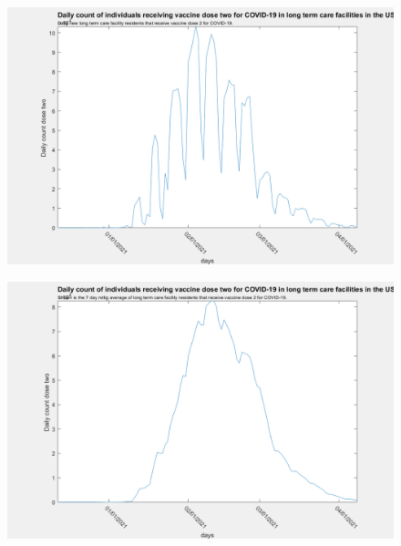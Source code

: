 \documentclass[twoside]{article}
\begin{document}
\begin{multicols}{2}
\begin{figure}[H]
	\includegraphics[width=\linewidth]{images/usa_daily_ltc_second_dose_unprocessed.png}
	\caption{}
	\label{fig:images/usa_daily_ltc_second_dose_unprocessedLabel}
\end{figure}

\begin{figure}[H]
	\includegraphics[width=\linewidth]{images/usa_daily_ltc_second_dose_processed.png}
	\caption{}
	\label{fig:images/usa_daily_ltc_second_dose_processedLabel}
\end{figure}


\end{multicols}
\end{document}
